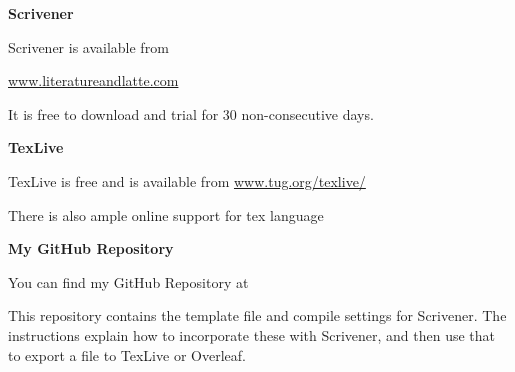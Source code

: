 \documentclass[unknownkeysallowed,usepdftitle=false, aspectratio=169,parskip=full]{beamer}
\newcommand{\secvariable}{nothing}
\newcommand{\mysection}[1]{\renewcommand{\secvariable}{#1}
}
\begin{document}
\mysection{radar}
\begin{frame}\label{\secvariable}
    \textbf{Scrivener}
    
    Scrivener is available from 
    
    \url{www.literatureandlatte.com}
    
    It is free to download and trial for 30 non-consecutive days. 
    
      \vspace{12pt}
    \textbf{TexLive}  
	
	TexLive is free and is available from \url{www.tug.org/texlive/}
	
	There is also ample online support for tex language
	
	\vspace{12pt}
	
	\textbf{My GitHub Repository}
	
	You can find my GitHub Repository at
	
\url{}

This repository contains the template file and compile settings for Scrivener. The instructions explain how to incorporate these with Scrivener, and then use that to export a file to TexLive or Overleaf.
	  
    
  
\end{frame}
\end{document}
